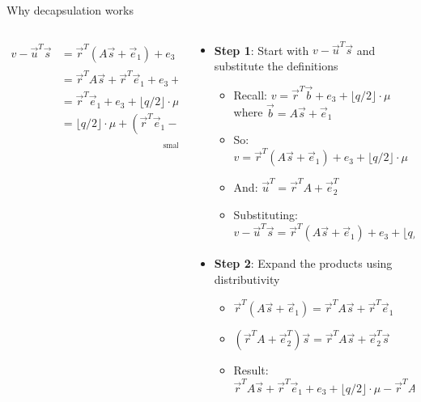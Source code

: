 \documentclass[aspectratio=169, lualatex, handout]{beamer}
\begin{document}
\begin{frame}{Why decapsulation works}
	\begin{columns}[c]
		\begin{column}{0.3\textwidth}
			\tiny
			\begin{align*}
				v - \vec{u}^T\vec{s} & = \vec{r}^{T}(A\vec{s} + \vec{e}_1) + e_3 + \lfloor q/2 \rfloor \cdot \mu - (\vec{r}^{T}A + \vec{e}_{2}^{T})\vec{s}               \\
				                     & = \vec{r}^{T}A\vec{s} + \vec{r}^{T}\vec{e}_1 + e_3 + \lfloor q/2 \rfloor \cdot \mu - \vec{r}^{T}A\vec{s} - \vec{e}_{2}^{T}\vec{s} \\
				                     & = \vec{r}^{T}\vec{e}_{1} + e_3 + \lfloor q/2 \rfloor \cdot \mu - \vec{e}_{2}^{T}\vec{s}                                           \\
				                     & = \lfloor q/2 \rfloor \cdot \mu + \underbrace{(\vec{r}^{T}\vec{e}_{1} - \vec{e}_{2}^{T}\vec{s} + e_3)}_{\text{small error}}
			\end{align*}
		\end{column}
		\begin{column}{0.7\textwidth}
			\begin{itemize}
				\item \textbf{Step 1}: Start with $v - \vec{u}^T\vec{s}$ and substitute the definitions
				      \begin{itemize}
					      \item Recall: $v = \vec{r}^T\vec{b} + e_3 + \lfloor q/2 \rfloor \cdot \mu$ where $\vec{b} = A\vec{s} + \vec{e}_1$
					      \item So: $v = \vec{r}^T(A\vec{s} + \vec{e}_1) + e_3 + \lfloor q/2 \rfloor \cdot \mu$
					      \item And: $\vec{u}^T = \vec{r}^TA + \vec{e}_2^T$
					      \item Substituting: $v - \vec{u}^T\vec{s} = \vec{r}^T(A\vec{s} + \vec{e}_1) + e_3 + \lfloor q/2 \rfloor \cdot \mu - (\vec{r}^TA + \vec{e}_2^T)\vec{s}$
				      \end{itemize}
				\item \textbf{Step 2}: Expand the products using distributivity
				      \begin{itemize}
					      \item $\vec{r}^T(A\vec{s} + \vec{e}_1) = \vec{r}^TA\vec{s} + \vec{r}^T\vec{e}_1$
					      \item $(\vec{r}^TA + \vec{e}_2^T)\vec{s} = \vec{r}^TA\vec{s} + \vec{e}_2^T\vec{s}$
					      \item Result: $\vec{r}^TA\vec{s} + \vec{r}^T\vec{e}_1 + e_3 + \lfloor q/2 \rfloor \cdot \mu - \vec{r}^TA\vec{s} - \vec{e}_2^T\vec{s}$
				      \end{itemize}
			\end{itemize}
		\end{column}
	\end{columns}
\end{frame}
\end{document}
